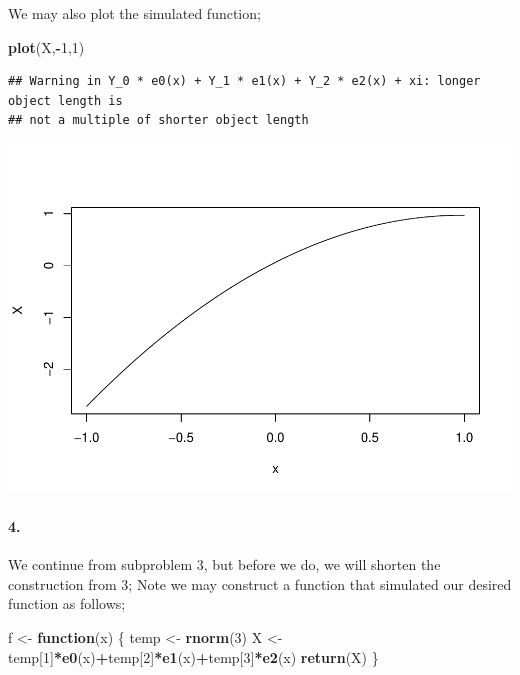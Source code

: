 \documentclass[
]{article}
\newenvironment{Shaded}{\begin{snugshade}}{\end{snugshade}}
\newcommand{\ControlFlowTok}[1]{\textcolor[rgb]{0.13,0.29,0.53}{\textbf{#1}}}
\newcommand{\DecValTok}[1]{\textcolor[rgb]{0.00,0.00,0.81}{#1}}
\newcommand{\KeywordTok}[1]{\textcolor[rgb]{0.13,0.29,0.53}{\textbf{#1}}}
\newcommand{\NormalTok}[1]{#1}
\newcommand{\OperatorTok}[1]{\textcolor[rgb]{0.81,0.36,0.00}{\textbf{#1}}}
\newcommand{\StringTok}[1]{\textcolor[rgb]{0.31,0.60,0.02}{#1}}
\begin{document}
We may also plot the simulated function;

\begin{Shaded}
\begin{Highlighting}[]
\KeywordTok{plot}\NormalTok{(X,}\OperatorTok{-}\DecValTok{1}\NormalTok{,}\DecValTok{1}\NormalTok{)}
\end{Highlighting}
\end{Shaded}

\begin{verbatim}
## Warning in Y_0 * e0(x) + Y_1 * e1(x) + Y_2 * e2(x) + xi: longer object length is
## not a multiple of shorter object length
\end{verbatim}

\begin{center}\includegraphics{matstatproblems20-21_files/figure-latex/unnamed-chunk-39-1} \end{center}

\hypertarget{section-33}{%
\paragraph{\texorpdfstring{\textbf{4.}}{4.}}\label{section-33}}

We continue from subproblem 3, but before we do, we will shorten the
construction from 3; Note we may construct a function that simulated our
desired function as follows;

\begin{Shaded}
\begin{Highlighting}[]
\NormalTok{f <-}\StringTok{ }\ControlFlowTok{function}\NormalTok{(x) \{}
\NormalTok{   temp <-}\StringTok{ }\KeywordTok{rnorm}\NormalTok{(}\DecValTok{3}\NormalTok{)}
\NormalTok{   X <-}\StringTok{ }\NormalTok{temp[}\DecValTok{1}\NormalTok{]}\OperatorTok{*}\KeywordTok{e0}\NormalTok{(x)}\OperatorTok{+}\NormalTok{temp[}\DecValTok{2}\NormalTok{]}\OperatorTok{*}\KeywordTok{e1}\NormalTok{(x)}\OperatorTok{+}\NormalTok{temp[}\DecValTok{3}\NormalTok{]}\OperatorTok{*}\KeywordTok{e2}\NormalTok{(x)}
   \KeywordTok{return}\NormalTok{(X)}
\NormalTok{\}}
\end{Highlighting}
\end{Shaded}
\end{document}
